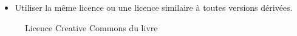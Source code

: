 \documentclass[
  11pt,
  letterpaper,
  open=any,
  twoside=false,
  french]{scrbook}
\providecommand{\tightlist}{%
  \setlength{\itemsep}{0pt}\setlength{\parskip}{0pt}}\usepackage{longtable,booktabs,array}
\begin{document}
\begin{itemize}
\tightlist
\item
  Utiliser la même licence ou une licence similaire à toutes versions
  dérivées.
\end{itemize}

\begin{figure}


\caption{\label{fig-Licence}Licence Creative Commons du livre}

\end{figure}%
\end{document}
